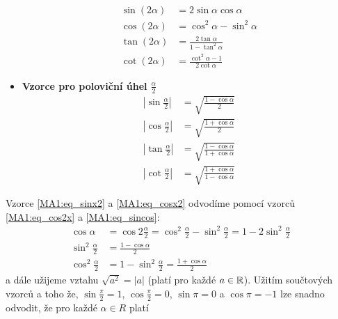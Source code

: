\begin{itemize}
            \begin{align}
              \sin(2\alpha)   &= 2\sin\alpha\cos\alpha                \label{MA1:eq_sin2x} \\ 
              \cos(2\alpha)   &= \cos^2\alpha - \sin^2\alpha          \label{MA1:eq_cos2x} \\ 
              \tan(2\alpha)   &= \frac{2\tan\alpha}{1-\tan^2\alpha}   \label{MA1:eq_tan2x} \\ 
              \cot(2\alpha)   &= \frac{\cot^2\alpha - 1}{2\cot\alpha}                               \label{MA1:eq_cot2x}
            \end{align}
          \item \textbf{Vzorce pro poloviční úhel $\displaystyle\frac{\alpha}{2}$}
            \begin{align}
              \left|\sin\frac{\alpha}{2}\right|   
                &= \sqrt{\frac{1-\cos\alpha}{2}}                      \label{MA1:eq_sinx2} \\ 
              \left|\cos\frac{\alpha}{2}\right|   
                &= \sqrt{\frac{1+\cos\alpha}{2}}                      \label{MA1:eq_cosx2} \\ 
              \left|\tan\frac{\alpha}{2}\right|   
                &= \sqrt{\frac{1-\cos\alpha}{1+\cos\alpha}}           \label{MA1:eq_tanx2} \\ 
              \left|\cot\frac{\alpha}{2}\right|   
                &= \sqrt{\frac{1+\cos\alpha}{1-\cos\alpha}}           \label{MA1:eq_cotx2}
            \end{align}
        \end{itemize}
        Vzorce \ref{MA1:eq_sinx2} a \ref{MA1:eq_cosx2} odvodíme pomocí vzorců \ref{MA1:eq_cos2x} a \ref{MA1:eq_sincos}:
        \begin{align*}
          \cos\alpha &= 
          \cos2\frac{\alpha}{2}=\cos^2\frac{\alpha}{2}-\sin^2\frac{\alpha}{2}=1-2\sin^2\frac{\alpha}{2} \\
          \sin^2\frac{\alpha}{2} &= \frac{1-\cos\alpha}{2}   \\
          \cos^2\frac{\alpha}{2} &= 1 - \sin^2\frac{\alpha}{2} = \frac{1+\cos\alpha}{2} 
        \end{align*}
        a dále užijeme vztahu $\sqrt{a^2}=|a|$ (platí pro každé $a\in\mathbb{R}$). Užitím součtových vzorců a 
        toho že, $\sin\frac{\pi}{2} = 1$, $\cos\frac{\pi}{2} = 0$, $\sin\pi = 0$ a $\cos\pi = -1$ lze snadno 
        odvodit, že pro každé 
        $\alpha\in R$ platí

